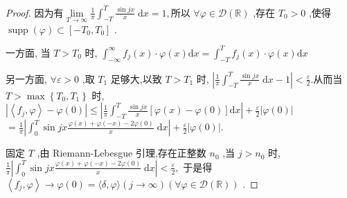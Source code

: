 \documentclass[lang=cn,newtx,10pt,scheme=chinese,thmcnt=chapter]{elegantbook}
\begin{document}
\begin{proof}
因为有\( \mathop{\lim }\limits_{{T \rightarrow  \infty }}\frac{1}{\pi }{\int }_{-T}^{T}\frac{\sin {jx}}{x}\mathrm{\;d}x = 1, \)所以 \( \forall \varphi  \in  \mathcal{D}\left( \mathbb{R}\right) \) ,存在 \( {T}_{0} > 0 \) ,使得 \( \operatorname{supp}\left( \varphi \right)  \subset  \left\lbrack  {-{T}_{0},{T}_{0}}\right\rbrack \) .

一方面,
当 \( T > {T}_{0} \) 时,
\( {\int }_{-\infty }^{\infty }{f}_{j}\left( x\right)  \cdot  \varphi \left( x\right) \mathrm{d}x = {\int }_{-T}^{T}{f}_{j}\left( x\right)  \cdot  \varphi \left( x\right) \mathrm{d}x \)

另一方面, \( \forall \varepsilon  > 0 \) ,取 \( {T}_{1} \) 足够大,以致 \( T > {T}_{1} \) 时,
\( \left| {\frac{1}{\pi }{\int }_{-T}^{T}\frac{\sin {jx}}{x}\mathrm{\;d}x - 1}\right|  < \frac{\varepsilon }{2}. \)从而当 \( T > \max \left\{  {{T}_{0},{T}_{1}}\right\} \) 时,
\( \left| {\left\langle  {{f}_{j},\varphi }\right\rangle   - \varphi \left( 0\right) }\right|  \leqslant  \left| {\frac{1}{\pi }{\int }_{-T}^{T}\frac{\sin {jx}}{x}\left\lbrack  {\varphi \left( x\right)  - \varphi \left( 0\right) }\right\rbrack  \mathrm{d}x}\right|  + \frac{\varepsilon }{2}\left| {\varphi \left( 0\right) }\right| \)
\( = \frac{1}{\pi }\left| {{\int }_{0}^{T}\sin {jx}\frac{\varphi \left( x\right)  + \varphi \left( {-x}\right)  - {2\varphi }\left( 0\right) }{x}\mathrm{\;d}x}\right|  + \frac{\varepsilon }{2}\left| {\varphi \left( 0\right) }\right| . \)

固定 \( T \) ,由 Riemann-Lebesgue 引理,存在正整数 \( {n}_{0} \) ,当 \( j > {n}_{0} \) 时,
\( \frac{1}{\pi }\left| {{\int }_{0}^{T}\sin {jx}\frac{\varphi \left( x\right)  + \varphi \left( {-x}\right)  - {2\varphi }\left( 0\right) }{x}\mathrm{\;d}x}\right|  < \frac{\varepsilon }{2}, \)
于是得 \( \left\langle  {{f}_{j},\varphi }\right\rangle   \rightarrow  \varphi \left( 0\right)  = \langle \delta ,\varphi \rangle \left( {j \rightarrow  \infty }\right) \left( {\forall \varphi  \in  \mathcal{D}\left( \mathbb{R}\right) }\right) \) .
\end{proof}
\end{document}

